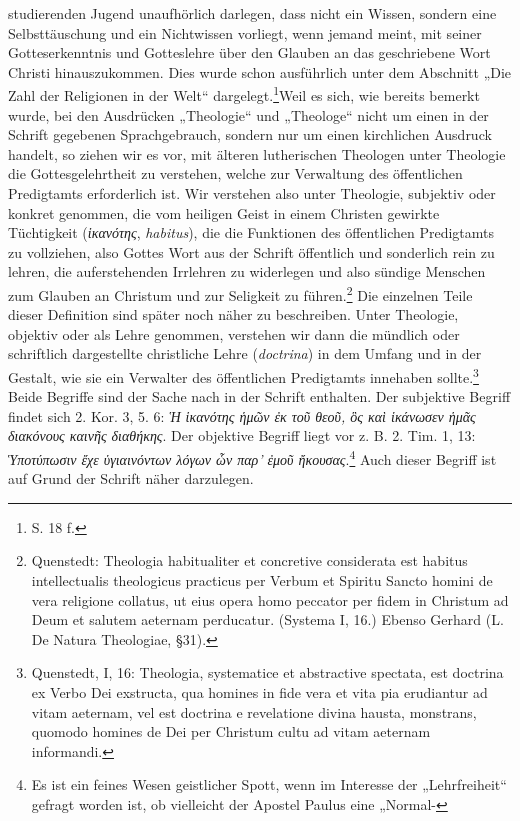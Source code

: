 studierenden Jugend unaufhörlich darlegen, dass nicht ein Wissen, sondern eine Selbsttäuschung und ein Nichtwissen vorliegt, wenn jemand meint, mit seiner Gotteserkenntnis und Gotteslehre über den Glauben an das geschriebene Wort Christi hinauszukommen. Dies wurde schon ausführlich unter dem Abschnitt „Die Zahl der Religionen in der Welt“ dargelegt.\footnote{S. 18 f.}Weil es sich, wie bereits bemerkt wurde, bei den Ausdrücken „Theologie“ und „Theologe“ nicht um einen in der Schrift gegebenen Sprachgebrauch, sondern nur um einen kirchlichen Ausdruck handelt, so ziehen wir es vor, mit älteren lutherischen Theologen unter Theologie die Gottesgelehrtheit zu verstehen, welche zur Verwaltung des öffentlichen Predigtamts erforderlich ist. Wir verstehen also unter Theologie, subjektiv oder konkret genommen, die vom heiligen Geist in einem Christen gewirkte Tüchtigkeit (\textit{ἱκανότης}, \textit{habitus}), die die Funktionen des öffentlichen Predigtamts zu vollziehen, also Gottes Wort aus der Schrift öffentlich und sonderlich rein zu lehren, die auferstehenden Irrlehren zu widerlegen und also sündige Menschen zum Glauben an Christum und zur Seligkeit zu führen.\footnote{Quenstedt: Theologia habitualiter et concretive considerata est habitus intellectualis theologicus practicus per Verbum et Spiritu Sancto homini de vera religione collatus, ut eius opera homo peccator per fidem in Christum ad Deum et salutem aeternam perducatur. (Systema I, 16.) Ebenso Gerhard (L. De Natura Theologiae, \S 31).} Die einzelnen Teile dieser Definition sind später noch näher zu beschreiben. Unter Theologie, objektiv oder als Lehre genommen, verstehen wir dann die mündlich oder schriftlich dargestellte christliche Lehre (\textit{doctrina}) in dem Umfang und in der Gestalt, wie sie ein Verwalter des öffentlichen Predigtamts innehaben sollte.\footnote{Quenstedt, I, 16: Theologia, systematice et abstractive spectata, est doctrina ex Verbo Dei exstructa, qua homines in fide vera et vita pia erudiantur ad vitam aeternam, vel est doctrina e revelatione divina hausta, monstrans, quomodo homines de Dei per Christum cultu ad vitam aeternam informandi.} Beide Begriffe sind der Sache nach in der Schrift enthalten. Der subjektive Begriff findet sich 2. Kor. 3, 5. 6: \textit{Ἡ ἱκανότης ἡμῶν ἐκ τοῦ θεοῦ, ὃς καὶ ἱκάνωσεν ἡμᾶς διακόνους καινῆς διαθήκης}. Der objektive Begriff liegt vor z. B. 2. Tim. 1, 13: \textit{Ὑποτύπωσιν ἔχε ὑγιαινόντων λόγων ὧν παρ’ ἐμοῦ ἤκουσας}.\footnote{Es ist ein feines Wesen geistlicher Spott, wenn im Interesse der „Lehrfreiheit“ gefragt worden ist, ob vielleicht der Apostel Paulus eine „Normal-} Auch dieser Begriff ist auf Grund der Schrift näher darzulegen.